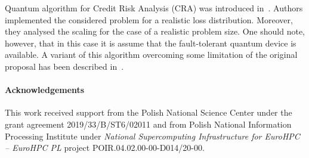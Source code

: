 \documentclass[a4paper,11pt]{article}
\begin{document}
Quantum algorithm for Credit Risk Analysis (CRA) was introduced in~\cite{egger2021credit}. Authors implemented the considered problem for a realistic loss distribution. Moreover, they analysed the scaling  for the case of a realistic problem size. One should note, however, that in this case it is assume that the fault-tolerant quantum device is available. A variant of this algorithm overcoming some limitation of the original proposal has been described in~\cite{dri2022towards,dri2023more}.





%
%


\paragraph{Acknowledgements}
This work received support from the Polish National Science Center under the grant agreement 2019/33/B/ST6/02011 and from Polish National Information Processing Institute  under \emph{National Supercomputing Infrastructure for EuroHPC -- EuroHPC PL} project POIR.04.02.00-00-D014/20-00.



\end{document}
